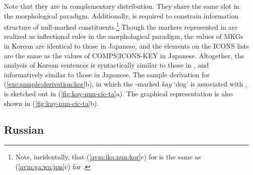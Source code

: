 \noindent Note that they are in complementary distribution. They share
the same slot in the morphological paradigm.  Additionally,
 is required to constrain information structure of
null-marked constituents.\footnote{Note, incidentally, that
  (\ref{avm:ika:nun:kor}c) for  is the same as
  (\ref{avm:ga:wa:jpn}c) for .}  Though the markers
represented in  are realized as inflectional
rules in the morphological paradigm, the values of MKGs in Korean are
identical to those in Japanese, and the elements on the ICONS
lists are the same as the values of COMPS{$\mid$}ICONS-KEY in
Japanese. Altogether, the analysis of Korean sentences
is syntactically similar to those in , and informatively
similar to those in Japanese. The sample derivation for
(\ref{exe:sample:derivation:kor}b), in which the \onun-marked
\textit{kay} `dog' is associated with , is
sketched out in (\ref{fig:kay-nun-cic-ta}a). The graphical
representation is also shown in (\ref{fig:kay-nun-cic-ta}b).





\subsection{Russian}
\label{9:ssec:rus}


